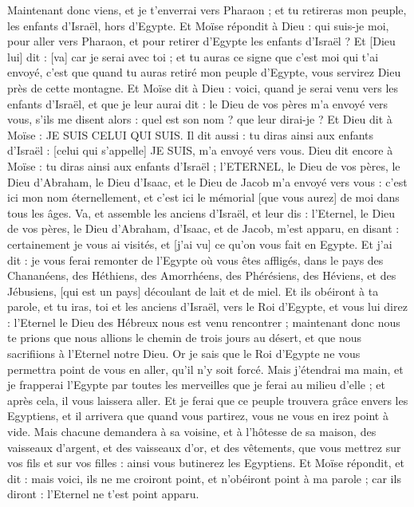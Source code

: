 \begin{multicols}{2}
Maintenant donc viens, et je t'enverrai vers Pharaon ; et tu retireras mon peuple, les enfants d'Israël, hors d'Egypte.
Et Moïse répondit à Dieu : qui suis-je moi, pour aller vers Pharaon, et pour retirer d'Egypte les enfants d'Israël ?
Et [Dieu lui] dit : [va] car je serai avec toi ; et tu auras ce signe que c'est moi qui t'ai envoyé, c'est que quand tu auras retiré mon peuple d'Egypte, vous servirez Dieu près de cette montagne.
Et Moïse dit à Dieu : voici, quand je serai venu vers les enfants d'Israël, et que je leur aurai dit : le Dieu de vos pères m'a envoyé vers vous, s'ils me disent alors : quel est son nom ? que leur dirai-je ?
Et Dieu dit à Moïse : JE SUIS CELUI QUI SUIS. Il dit aussi : tu diras ainsi aux enfants d'Israël : [celui qui s'appelle] JE SUIS, m'a envoyé vers vous.
Dieu dit encore à Moïse : tu diras ainsi aux enfants d'Israël ; l'ETERNEL, le Dieu de vos pères, le Dieu d'Abraham, le Dieu d'Isaac, et le Dieu de Jacob m'a envoyé vers vous : c'est ici mon nom éternellement, et c'est ici le mémorial [que vous aurez] de moi dans tous les âges.
Va, et assemble les anciens d'Israël, et leur dis : l'Eternel, le Dieu de vos pères, le Dieu d'Abraham, d'Isaac, et de Jacob, m'est apparu, en disant : certainement je vous ai visités, et [j'ai vu] ce qu'on vous fait en Egypte.
Et j'ai dit : je vous ferai remonter de l'Egypte où vous êtes affligés, dans le pays des Chananéens, des Héthiens, des Amorrhéens, des Phérésiens, des Héviens, et des Jébusiens, [qui est un pays] découlant de lait et de miel.
Et ils obéiront à ta parole, et tu iras, toi et les anciens d'Israël, vers le Roi d'Egypte, et vous lui direz : l'Eternel le Dieu des Hébreux nous est venu rencontrer ; maintenant donc nous te prions que nous allions le chemin de trois jours au désert, et que nous sacrifiions à l'Eternel notre Dieu.
Or je sais que le Roi d'Egypte ne vous permettra point de vous en aller, qu'il n'y soit forcé.
Mais j'étendrai ma main, et je frapperai l'Egypte par toutes les merveilles que je ferai au milieu d'elle ; et après cela, il vous laissera aller.
Et je ferai que ce peuple trouvera grâce envers les Egyptiens, et il arrivera que quand vous partirez, vous ne vous en irez point à vide.
Mais chacune demandera à sa voisine, et à l'hôtesse de sa maison, des vaisseaux d'argent, et des vaisseaux d'or, et des vêtements, que vous mettrez sur vos fils et sur vos filles : ainsi vous butinerez les Egyptiens.
\VerseOne{}Et Moïse répondit, et dit : mais voici, ils ne me croiront point, et n'obéiront point à ma parole ; car ils diront : l'Eternel ne t'est point apparu.

\end{multicols}
